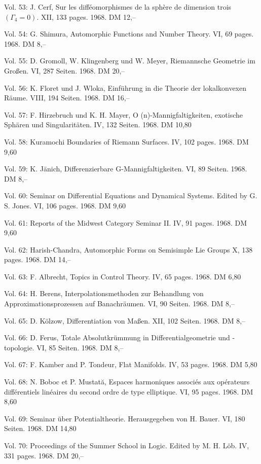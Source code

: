 Vol. 53: J. Cerf, Sur les difféomorphismes de la sphère de dimension trois \((\Gamma_4=0)\). XII, 133 pages. 1968. DM 12,--

Vol. 54: G. Shimura, Automorphic Functions and Number Theory. VI, 69 pages. 1968. DM 8,--

Vol. 55: D. Gromoll, W. Klingenberg und W. Meyer, Riemannsche Geometrie im Großen. VI, 287 Seiten. 1968. DM 20,--

Vol. 56: K. Floret und J. Wloka, Einführung in die Theorie der lokalkonvexen Räume. VIII, 194 Seiten. 1968. DM 16,--

Vol. 57: F. Hirzebruch und K. H. Mayer, O (n)-Mannigfaltigkeiten, exotische Sphären und Singularitäten. IV, 132 Seiten. 1968. DM 10,80

Vol. 58: Kuramochi Boundaries of Riemann Surfaces. IV, 102 pages. 1968. DM 9,60

Vol. 59: K. Jänich, Differenzierbare G-Mannigfaltigkeiten. VI, 89 Seiten. 1968. DM 8,--

Vol. 60: Seminar on Differential Equations and Dynamical Systems. Edited by G. S. Jones. VI, 106 pages. 1968. DM 9,60

Vol. 61: Reports of the Midwest Category Seminar II. IV, 91 pages. 1968. DM 9,60

Vol. 62: Harish-Chandra, Automorphic Forms on Semisimple Lie Groups X, 138 pages. 1968. DM 14,--

Vol. 63: F. Albrecht, Topics in Control Theory. IV, 65 pages. 1968. DM 6,80

Vol. 64: H. Berens, Interpolationsmethoden zur Behandlung von Approximationsprozessen auf Banachräumen. VI, 90 Seiten. 1968. DM 8,--

Vol. 65: D. Kölzow, Differentiation von Maßen. XII, 102 Seiten. 1968. DM 8,--

Vol. 66: D. Ferus, Totale Absolutkrümmung in Differentialgeometrie und -topologie. VI, 85 Seiten. 1968. DM 8,--

Vol. 67: F. Kamber and P. Tondeur, Flat Manifolds. IV, 53 pages. 1968. DM 5,80

Vol. 68: N. Boboc et P. Mustată, Espaces harmoniques associés aux opérateurs différentiels linéaires du second ordre de type elliptique. VI, 95 pages. 1968. DM 8,60

Vol. 69: Seminar über Potentialtheorie. Herausgegeben von H. Bauer. VI, 180 Seiten. 1968. DM 14,80

Vol. 70: Proceedings of the Summer School in Logic. Edited by M. H. Löb. IV, 331 pages. 1968. DM 20,--


